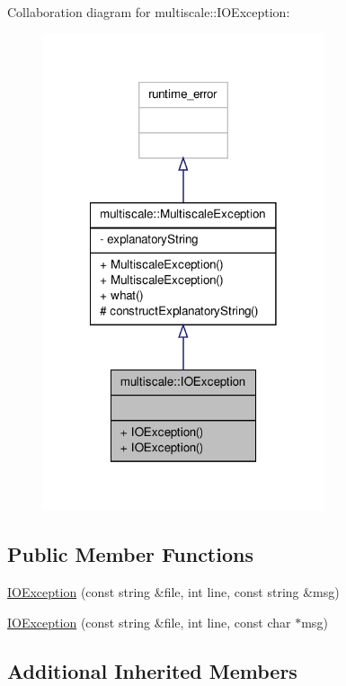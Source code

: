 Collaboration diagram for multiscale\-:\-:I\-O\-Exception\-:
\nopagebreak
\begin{figure}[H]
\begin{center}
\leavevmode
\includegraphics[width=234pt]{classmultiscale_1_1IOException__coll__graph}
\end{center}
\end{figure}
\subsection*{Public Member Functions}
\begin{DoxyCompactItemize}
\item 
\hyperlink{classmultiscale_1_1IOException_a081bb2e4c214a18cbace0d93e1b60488}{I\-O\-Exception} (const string \&file, int line, const string \&msg)
\item 
\hyperlink{classmultiscale_1_1IOException_a2ccacf8690ac56b07af15da7fa7bb93a}{I\-O\-Exception} (const string \&file, int line, const char $\ast$msg)
\end{DoxyCompactItemize}
\subsection*{Additional Inherited Members}


